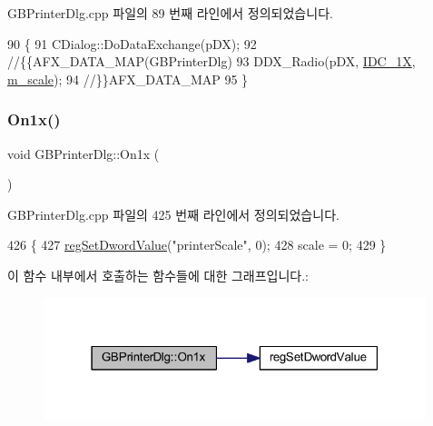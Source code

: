 G\+B\+Printer\+Dlg.\+cpp 파일의 89 번째 라인에서 정의되었습니다.


\begin{DoxyCode}
90 \{
91   CDialog::DoDataExchange(pDX);
92   \textcolor{comment}{//\{\{AFX\_DATA\_MAP(GBPrinterDlg)}
93   DDX\_Radio(pDX, \mbox{\hyperlink{resource_8h_ab46df77d5928990eb38ef6adf205e203}{IDC\_1X}}, \mbox{\hyperlink{class_g_b_printer_dlg_a0d0e4757bd074a2ab18268b938f76f85}{m\_scale}});
94   \textcolor{comment}{//\}\}AFX\_DATA\_MAP}
95 \}
\end{DoxyCode}
\mbox{\label{class_g_b_printer_dlg_a56ab3fb0b4285c737a7ea796771a01a4}} 
\subsubsection{\texorpdfstring{On1x()}{On1x()}}
{\footnotesize\ttfamily void G\+B\+Printer\+Dlg\+::\+On1x (\begin{DoxyParamCaption}{ }\end{DoxyParamCaption})\hspace{0.3cm}{\ttfamily [protected]}}



G\+B\+Printer\+Dlg.\+cpp 파일의 425 번째 라인에서 정의되었습니다.


\begin{DoxyCode}
426 \{
427   \mbox{\hyperlink{_reg_8cpp_a758e775489a3fb5c3cc7071fdd5af87e}{regSetDwordValue}}(\textcolor{stringliteral}{"printerScale"}, 0);
428   scale = 0;
429 \}
\end{DoxyCode}
이 함수 내부에서 호출하는 함수들에 대한 그래프입니다.\+:
\nopagebreak
\begin{figure}[H]
\begin{center}
\leavevmode
\includegraphics[width=316pt]{class_g_b_printer_dlg_a56ab3fb0b4285c737a7ea796771a01a4_cgraph}
\end{center}
\end{figure}
\mbox{\label{class_g_b_printer_dlg_a9b887ad630794874e2b39c3558bf5d33}} 
